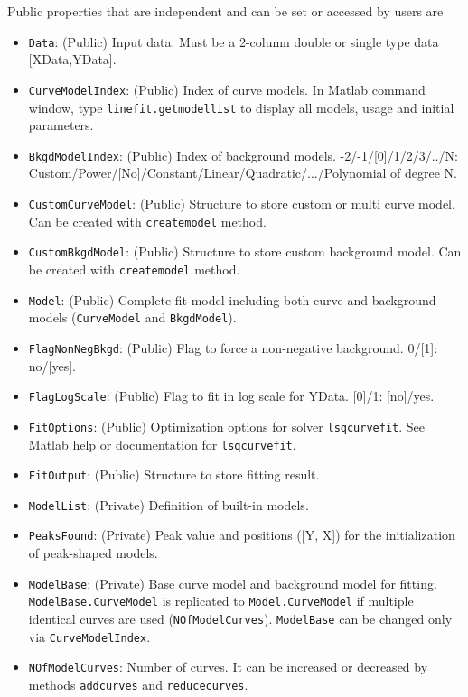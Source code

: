 \documentclass[reprint,showpacs,prb,nofootinbib,amsmath,amssymb]{revtex4-1}
\begin{document}
Public properties that are independent and can be set or accessed by users are
\begin{itemize}
\item \verb"Data": (Public) Input data. Must be a 2-column double or single type data [XData,YData].
\item \verb"CurveModelIndex": (Public) Index of curve models. In Matlab command window, type \verb"linefit.getmodellist" to display all models, usage and initial parameters.
\item \verb"BkgdModelIndex": (Public) Index of background models. -2/-1/[0]/1/2/3/../N: Custom/Power/[No]/Constant/Linear/Quadratic/.../Polynomial of degree N.
\item \verb"CustomCurveModel": (Public) Structure to store custom or multi curve model. Can be created with \verb"createmodel" method.
\item \verb"CustomBkgdModel": (Public) Structure to store custom background model. Can be created with \verb"createmodel" method.
\item \verb"Model": (Public) Complete fit model including both curve and background models (\verb"CurveModel" and \verb"BkgdModel").
\item \verb"FlagNonNegBkgd": (Public) Flag to force a non-negative background. 0/[1]: no/[yes]. 
\item \verb"FlagLogScale": (Public) Flag to fit in log scale for YData. [0]/1: [no]/yes.
\item \verb"FitOptions": (Public) Optimization options for solver \verb"lsqcurvefit". See Matlab help or documentation for \verb"lsqcurvefit".
\item \verb"FitOutput": (Public) Structure to store fitting result.
\item \verb"ModelList": (Private) Definition of built-in models.
\item \verb"PeaksFound": (Private) Peak value and positions ([Y, X]) for the initialization of peak-shaped models.
\item \verb"ModelBase": (Private) Base curve model and background model for fitting. \verb|ModelBase.CurveModel| is replicated to \verb"Model.CurveModel" if multiple identical curves are used (\verb|NOfModelCurves|). \verb|ModelBase| can be changed only via \verb|CurveModelIndex|.
\item \verb"NOfModelCurves": Number of curves. It can be increased or decreased by methods \verb|addcurves| and \verb|reducecurves|.
\end{itemize}
\end{document}
